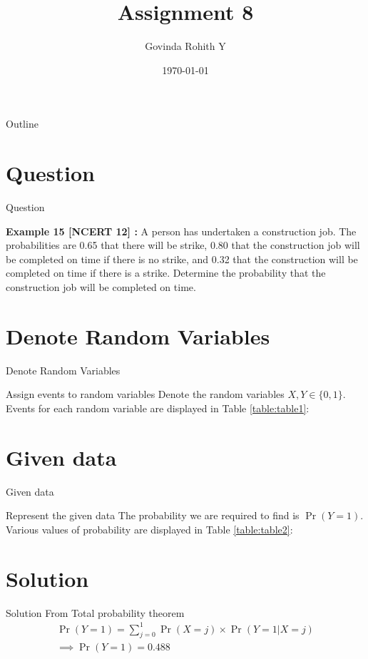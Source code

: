 \documentclass{beamer}
\title{Assignment 8}
\author{Govinda Rohith Y}
\date{\today}
\providecommand{\pr}[1]{\ensuremath{\Pr\left(#1\right)}}
\begin{document}
\begin{frame}
    \titlepage 
\end{frame}

\logo{}


\begin{frame}{Outline}
    \tableofcontents
\end{frame}


\section{Question}
\begin{frame}{Question}

\begin{block}{\textbf{Example 15 [NCERT 12] :}}
        A person has undertaken a construction job. The probabilities are 0.65 that there will be strike, 0.80 that the construction job will be completed on time if there is no strike, and 0.32 that the construction will be completed on time if there is a strike. Determine the probability that the construction job will be completed on time.\\
    \end{block}

\end{frame}


\section{Denote Random Variables}
\begin{frame}{Denote Random Variables}
    \begin{block}{Assign events to random variables}
    Denote the random variables $X,Y\in \{0,1\}$. Events for each random variable are displayed in  Table \ref{table:table1}:
    \end{block}
    \begin{table}[h!]
	
	\caption{}
    \label{table:table1}
    \end{table}
     
     \end{frame} 
     \section{Given data}
     \begin{frame}{Given data}
\begin{block}{Represent the given data}
The probability we are required to find is $\pr{Y=1}$. Various values of probability are displayed in Table \ref{table:table2}:

\end{block}
\begin{table}[h!]
	
	\caption{}
    \label{table:table2}
    \end{table}
\end{frame} 

\section{Solution}
     \begin{frame}{Solution}
      From Total probability theorem
    \begin{align}
    \pr{Y=1}=\sum_{j=0}^1 \pr{X=j}\times\pr{Y=1|X=j} \\
    \implies\boxed{\pr{Y=1}=0.488}
\end{align}
     \end{frame}
\end{document}
